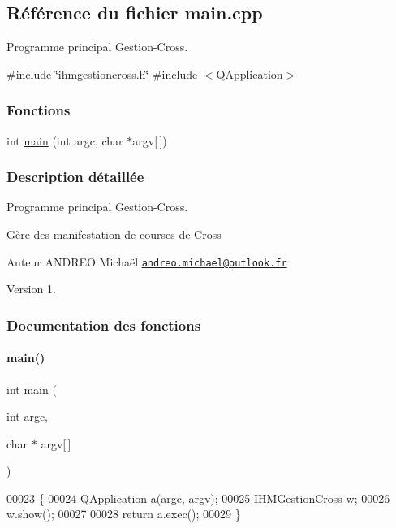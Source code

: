 \hypertarget{_gestion-_cross_2main_8cpp}{}\subsection{Référence du fichier main.\+cpp}
\label{_gestion-_cross_2main_8cpp}


Programme principal Gestion-\/\+Cross.  


{\ttfamily \#include \char`\"{}ihmgestioncross.\+h\char`\"{}}\newline
{\ttfamily \#include $<$Q\+Application$>$}\newline
\subsubsection*{Fonctions}
\begin{DoxyCompactItemize}
\item 
int \hyperlink{_gestion-_cross_2main_8cpp_a0ddf1224851353fc92bfbff6f499fa97}{main} (int argc, char $\ast$argv\mbox{[}$\,$\mbox{]})
\end{DoxyCompactItemize}


\subsubsection{Description détaillée}
Programme principal Gestion-\/\+Cross. 

Gère des manifestation de courses de Cross

\begin{DoxyAuthor}{Auteur}
A\+N\+D\+R\+EO Michaël \href{mailto:andreo.michael@outlook.fr}{\tt andreo.\+michael@outlook.\+fr}
\end{DoxyAuthor}
\begin{DoxyVersion}{Version}
1. 
\end{DoxyVersion}


\subsubsection{Documentation des fonctions}
\mbox{\label{_gestion-_cross_2main_8cpp_a0ddf1224851353fc92bfbff6f499fa97}} 
\paragraph{\texorpdfstring{main()}{main()}}
{\footnotesize\ttfamily int main (\begin{DoxyParamCaption}\item[{int}]{argc,  }\item[{char $\ast$}]{argv\mbox{[}$\,$\mbox{]} }\end{DoxyParamCaption})}


\begin{DoxyCode}
00023 \{
00024     QApplication a(argc, argv);
00025     \hyperlink{class_i_h_m_gestion_cross}{IHMGestionCross} w;
00026     w.show();
00027 
00028     \textcolor{keywordflow}{return} a.exec();
00029 \}
\end{DoxyCode}
